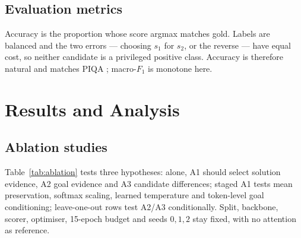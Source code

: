 \documentclass[11pt]{article}
\begin{document}
\subsection{Evaluation metrics}
\label{sec:metrics}

Accuracy is the proportion whose score argmax matches gold. Labels are
balanced and the two errors --- choosing $s_1$ for $s_2$, or the reverse ---
have equal cost, so neither candidate is a privileged positive class.
Accuracy is therefore natural and matches PIQA \citep{bisk2020piqa};
macro-$F_1$ is monotone here.

\section{Results and Analysis}
\label{sec:results}

\subsection{Ablation studies}
\label{sec:ablation}

Table~\ref{tab:ablation} tests three hypotheses: alone, A1 should select
solution evidence, A2 goal evidence and A3 candidate differences; staged A1
tests mean preservation, softmax scaling, learned temperature and token-level
goal conditioning; leave-one-out rows test A2/A3 conditionally. Split,
backbone, scorer, optimiser, 15-epoch budget and seeds $0,1,2$ stay fixed,
with no attention as reference.
\end{document}
